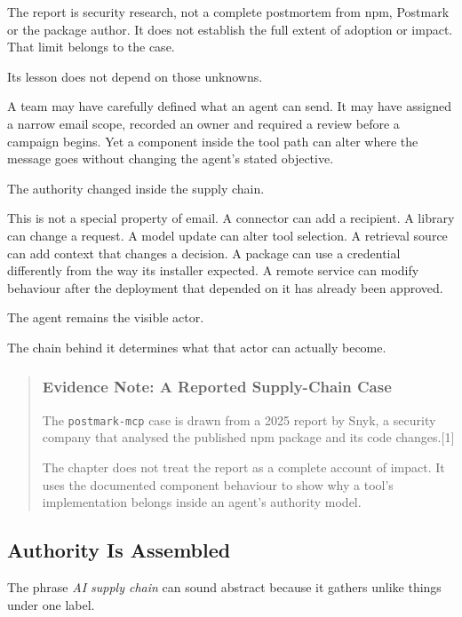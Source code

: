 The report is security research, not a complete postmortem from npm,
Postmark or the package author. It does not establish the full extent of
adoption or impact. That limit belongs to the case.

Its lesson does not depend on those unknowns.

A team may have carefully defined what an agent can send. It may have
assigned a narrow email scope, recorded an owner and required a review
before a campaign begins. Yet a component inside the tool path can alter
where the message goes without changing the agent's stated objective.

The authority changed inside the supply chain.

This is not a special property of email. A connector can add a
recipient. A library can change a request. A model update can alter tool
selection. A retrieval source can add context that changes a decision. A
package can use a credential differently from the way its installer
expected. A remote service can modify behaviour after the deployment
that depended on it has already been approved.

The agent remains the visible actor.

The chain behind it determines what that actor can actually become.

\begin{quote}
\subsubsection{Evidence Note: A Reported Supply-Chain
Case}\label{evidence-note-a-reported-supply-chain-case}

The \texttt{postmark-mcp} case is drawn from a 2025 report by Snyk, a
security company that analysed the published npm package and its code
changes.{[}1{]}

The chapter does not treat the report as a complete account of impact.
It uses the documented component behaviour to show why a tool's
implementation belongs inside an agent's authority model.
\end{quote}

\subsection{Authority Is Assembled}\label{authority-is-assembled}

The phrase \emph{AI supply chain} can sound abstract because it gathers
unlike things under one label.

